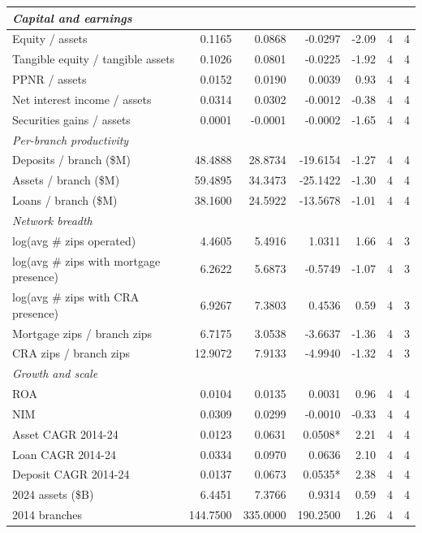\begin{tabular}{lrrrrrr}
\midrule
\multicolumn{7}{l}{\emph{Capital and earnings}} \\
\midrule
Equity / assets & 0.1165 & 0.0868 & -0.0297 & -2.09 & 4 & 4 \\
Tangible equity / tangible assets & 0.1026 & 0.0801 & -0.0225 & -1.92 & 4 & 4 \\
PPNR / assets & 0.0152 & 0.0190 & 0.0039 & 0.93 & 4 & 4 \\
Net interest income / assets & 0.0314 & 0.0302 & -0.0012 & -0.38 & 4 & 4 \\
Securities gains / assets & 0.0001 & -0.0001 & -0.0002 & -1.65 & 4 & 4 \\
\midrule
\multicolumn{7}{l}{\emph{Per-branch productivity}} \\
\midrule
Deposits / branch (\$M) & 48.4888 & 28.8734 & -19.6154 & -1.27 & 4 & 4 \\
Assets / branch (\$M) & 59.4895 & 34.3473 & -25.1422 & -1.30 & 4 & 4 \\
Loans / branch (\$M) & 38.1600 & 24.5922 & -13.5678 & -1.01 & 4 & 4 \\
\midrule
\multicolumn{7}{l}{\emph{Network breadth}} \\
\midrule
log(avg \# zips operated) & 4.4605 & 5.4916 & 1.0311 & 1.66 & 4 & 3 \\
log(avg \# zips with mortgage presence) & 6.2622 & 5.6873 & -0.5749 & -1.07 & 4 & 3 \\
log(avg \# zips with CRA presence) & 6.9267 & 7.3803 & 0.4536 & 0.59 & 4 & 3 \\
Mortgage zips / branch zips & 6.7175 & 3.0538 & -3.6637 & -1.36 & 4 & 3 \\
CRA zips / branch zips & 12.9072 & 7.9133 & -4.9940 & -1.32 & 4 & 3 \\
\midrule
\multicolumn{7}{l}{\emph{Growth and scale}} \\
\midrule
ROA & 0.0104 & 0.0135 & 0.0031 & 0.96 & 4 & 4 \\
NIM & 0.0309 & 0.0299 & -0.0010 & -0.33 & 4 & 4 \\
Asset CAGR 2014-24 & 0.0123 & 0.0631 & 0.0508* & 2.21 & 4 & 4 \\
Loan CAGR 2014-24 & 0.0334 & 0.0970 & 0.0636 & 2.10 & 4 & 4 \\
Deposit CAGR 2014-24 & 0.0137 & 0.0673 & 0.0535* & 2.38 & 4 & 4 \\
2024 assets (\$B) & 6.4451 & 7.3766 & 0.9314 & 0.59 & 4 & 4 \\
2014 branches & 144.7500 & 335.0000 & 190.2500 & 1.26 & 4 & 4 \\

\end{tabular}
